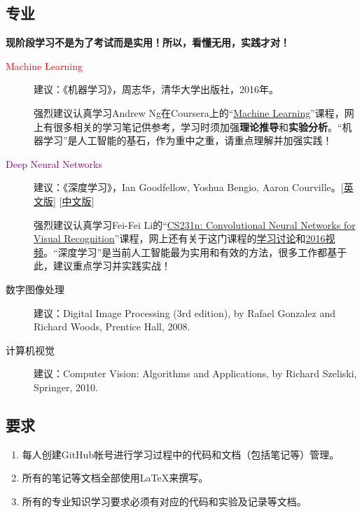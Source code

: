 \documentclass[14pt,a4paper]{extarticle}
\begin{document}
\subsection{专业}

\textbf{现阶段学习不是为了考试而是实用！所以，看懂无用，实践才对！}

\begin{description}
\item[\textcolor{red}{Machine Learning}] 建议：《机器学习》，周志华，清华大学出版社，2016年。

强烈建议认真学习Andrew Ng在Coursera上的“\href{https://www.coursera.org/learn/machine-learning}{Machine Learning}”课程，网上有很多相关的学习笔记供参考，学习时须加强\textbf{理论推导}和\textbf{实验分析}。“机器学习”是人工智能的基石，作为重中之重，请重点理解并加强实践！
\item[\textcolor{purple}{Deep Neural Networks}] 建议：《深度学习》，Ian Goodfellow, Yoshua Bengio, Aaron Courville。[\href{http://www.deeplearningbook.org}{英文版}] [\href{https://github.com/exacity/deeplearningbook-chinese}{中文版}]

强烈建议认真学习Fei-Fei Li的“\href{http://vision.stanford.edu/teaching.html}{CS231n: Convolutional Neural Networks for Visual Recognition}”课程，网上还有关于这门课程的\href{https://www.reddit.com/r/cs231n/}{学习讨论}和\href{https://www.youtube.com/playlist?list=PLkt2uSq6rBVctENoVBg1TpCC7OQi31AlC}{2016视频}。“深度学习”是当前人工智能最为实用和有效的方法，很多工作都基于此，建议重点学习并实践实战！
\item[数字图像处理] 建议：Digital Image Processing (3rd edition), by Rafael Gonzalez and Richard Woods, Prentice Hall, 2008.
\item[计算机视觉] 建议：Computer Vision: Algorithms and Applications, by Richard Szeliski, Springer, 2010.
\end{description}

\subsection{要求}

\begin{enumerate}
\item 每人创建GitHub帐号进行学习过程中的代码和文档（包括笔记等）管理。
\item 所有的笔记等文档全部使用\LaTeX{}来撰写。
\item 所有的专业知识学习要求必须有对应的代码和实验及记录等文档。
\end{enumerate}
\end{document}
